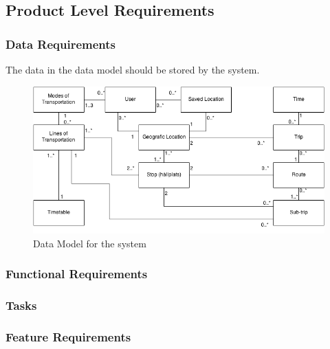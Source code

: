 \documentclass[a4paper]{article}
\begin{document}
		\subsection{Product Level Requirements}		
			\subsubsection{Data Requirements}
				The data in the data model should be stored by the system.	
				\begin{figure}[h]
					\includegraphics[scale=0.50]{datamodel-v1.png}
					\caption{Data Model for the system}
				\end{figure}
				
				
				
			\subsubsection{Functional Requirements}
				\subsubsection{Tasks}
					
		
			\subsubsection{Feature Requirements}
							
			
\end{document}
